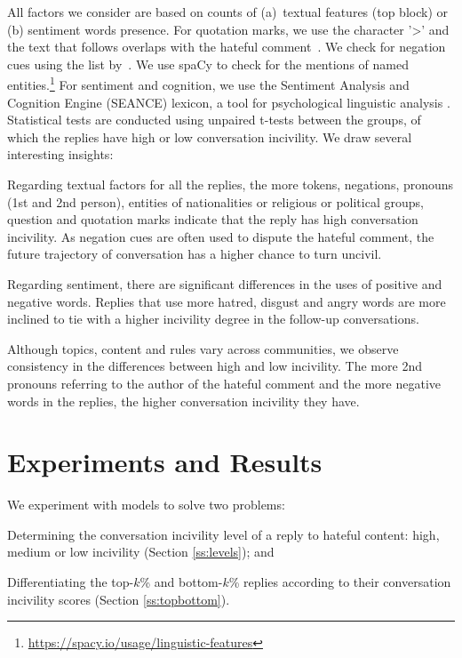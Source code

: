 \documentclass[11pt]{article}
\begin{document}
	All factors we consider are based on counts of
	(a)~textual features (top block)
	or
	(b) sentiment words presence.
	For quotation marks, we use the character  '>' and the text that follows overlaps with the hateful comment~\cite{chakrabarty-etal-2019-ampersand,jo-etal-2020-detecting}.
	We check for negation cues using the list by~\citet{fancellu-etal-2016-neural}. 
	We use spaCy to check for the mentions of named entities.\footnote{\url{https://spacy.io/usage/linguistic-features}}
	For sentiment and cognition, we use the Sentiment Analysis and Cognition Engine (SEANCE) lexicon,
	a tool for psychological linguistic analysis \cite{crossley2017sentiment}. 
	Statistical tests are conducted using unpaired t-tests between the groups, of which the replies have high or low conversation incivility.
	We draw several interesting insights:
	\begin{compactitem}
		\item Regarding textual factors for all the replies, the more tokens, negations, pronouns (1st and 2nd person), entities of nationalities or religious or political groups, question and quotation marks indicate that the reply has high conversation incivility.
		As negation cues are often used to dispute the hateful comment, the future trajectory of conversation has a higher chance to turn uncivil.
		\item Regarding sentiment, there are significant differences in the uses of positive and negative words. Replies that use more hatred, disgust and angry words are more inclined to tie with a higher incivility degree in the follow-up conversations.
		\item Although topics, content and rules vary across communities, we observe consistency in the differences between high and low incivility. The more 2nd pronouns referring to the author of the hateful comment and the more negative words in the replies, the higher conversation incivility they have.
	\end{compactitem}
	
	
	
	\section{Experiments and Results} 
	\label{s:experiments}
	
	We experiment with models to solve two problems:
	\begin{compactitem}
		\item Determining the conversation incivility level of a reply to hateful content: high, medium or low incivility (Section \ref{ss:levels}); and
		\item Differentiating the top-$k$\% and bottom-$k$\% replies according to their conversation incivility scores (Section \ref{ss:topbottom}).
	\end{compactitem}
	
\end{document}
